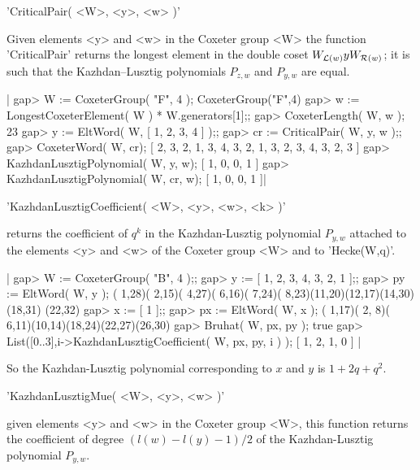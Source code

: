 
'CriticalPair( <W>, <y>, <w> )'

Given  elements  <y>  and  <w>  in  the  Coxeter  group  <W>  the  function
'CriticalPair'  returns the longest  element in the  double coset $W_{{\cal
L}(w)}y  W_{{\cal R}(w)}$; it is such that the Kazhdan--Lusztig polynomials
$P_{z,w}$ and $P_{y,w}$ are equal.

|    gap> W := CoxeterGroup( "F", 4 );
    CoxeterGroup("F",4)
    gap> w := LongestCoxeterElement( W ) * W.generators[1];;
    gap> CoxeterLength( W, w );
    23
    gap> y := EltWord( W, [ 1, 2, 3, 4 ] );;
    gap> cr := CriticalPair( W, y, w );;
    gap> CoxeterWord( W, cr);
    [ 2, 3, 2, 1, 3, 4, 3, 2, 1, 3, 2, 3, 4, 3, 2, 3 ]
    gap> KazhdanLusztigPolynomial( W, y, w);
    [ 1, 0, 0, 1 ]
    gap> KazhdanLusztigPolynomial( W, cr, w);
    [ 1, 0, 0, 1 ]|


'KazhdanLusztigCoefficient( <W>, <y>, <w>, <k> )'

returns   the  coefficient  of  $q^k$  in  the  Kazhdan-Lusztig  polynomial
$P_{y,w}$ attached to the elements <y> and <w> of the Coxeter group <W> and
to 'Hecke(W,q)'.

|    gap> W := CoxeterGroup( "B", 4 );;
    gap> y := [ 1, 2, 3, 4, 3, 2, 1 ];;
    gap> py := EltWord( W, y );
    ( 1,28)( 2,15)( 4,27)( 6,16)( 7,24)( 8,23)(11,20)(12,17)(14,30)(18,31)
    (22,32)
    gap> x := [ 1 ];;
    gap> px := EltWord( W, x );
    ( 1,17)( 2, 8)( 6,11)(10,14)(18,24)(22,27)(26,30)
    gap> Bruhat( W, px, py );
    true
    gap> List([0..3],i->KazhdanLusztigCoefficient( W, px, py, i ) );
    [ 1, 2, 1, 0 ] |

So  the  Kazhdan-Lusztig polynomial  corresponding  to  $x$  and  $y$  is
$1+2q+q^2$.


'KazhdanLusztigMue( <W>, <y>, <w> )'

given  elements <y> and <w> in the Coxeter group <W>, this function returns
the   coefficient  of  degree   $(l(w)-l(y)-1)/2$  of  the  Kazhdan-Lusztig
polynomial $P_{y,w}$.

